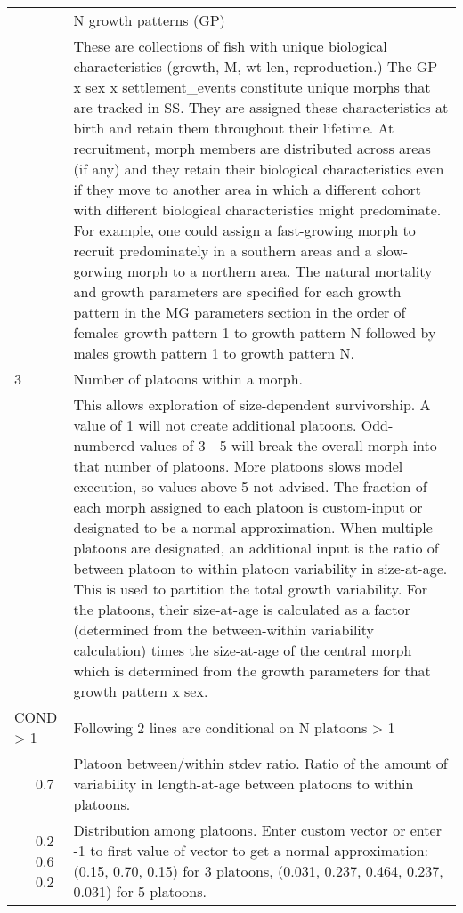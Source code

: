 \begin{center}
\begin{longtable}{p{0.5cm} p{2cm} p{12cm}}
		\pagebreak
		2 & & N growth patterns (GP)\\
		& & These are collections of fish with unique biological characteristics (growth, M, wt-len, reproduction.)  The GP x sex x settlement\_events constitute unique morphs that are tracked in SS.  They are assigned these characteristics at birth and retain them throughout their lifetime.  At recruitment, morph members are distributed across areas (if any) and they retain their biological characteristics even if they move to another area in which a different cohort with different biological characteristics might predominate.  For example, one could assign a fast-growing morph to recruit predominately in a southern areas and a slow-gorwing morph to a northern area.  The natural mortality and growth parameters are specified for each growth pattern in the MG parameters section in the order of females growth pattern 1 to growth pattern N followed by males growth pattern 1 to growth pattern N.\\
		\hline
		3 & & Number of platoons within a morph.\\
		& & This allows exploration of size-dependent survivorship. A value of 1 will not create additional platoons.  Odd-numbered values of 3 - 5 will break the overall morph into that number of platoons.  More platoons slows model execution, so values above 5 not advised.  The fraction of each morph assigned to each platoon is custom-input or designated to be a normal approximation.  When multiple platoons are designated, an additional input is the ratio of between platoon to within platoon variability in size-at-age.  This is used to partition the total growth variability.  For the platoons, their size-at-age is calculated as a factor (determined from the between-within variability calculation) times the size-at-age of the central morph which is determined from the growth parameters for that growth pattern x sex.\\

		\multicolumn{2}{l}{COND > 1}& \multicolumn{1}{l}{\parbox{12cm}{Following 2 lines are conditional on N platoons > 1}} \\

		& 0.7 & Platoon between/within stdev ratio. Ratio of the amount of variability in length-at-age between platoons to within platoons.\\

		& 0.2 0.6 0.2 & Distribution among platoons. Enter custom vector or enter -1 to first value of vector to get a normal approximation: (0.15, 0.70, 0.15) for 3 platoons, (0.031, 0.237, 0.464, 0.237, 0.031) for 5 platoons.\\
		\hline
	\end{longtable}
\end{center}


